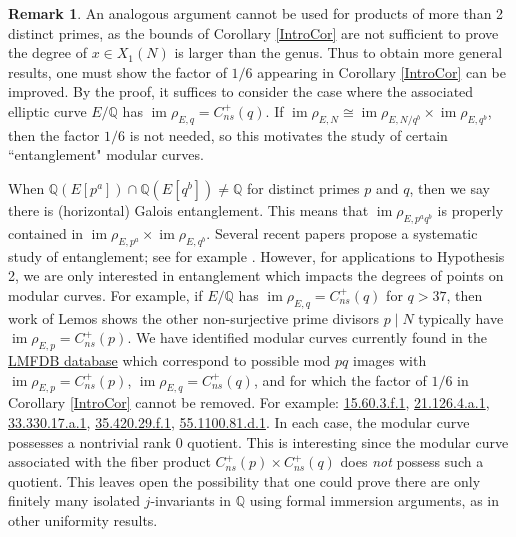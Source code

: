 \documentclass{amsart}
\theoremstyle{definition}
\newtheorem{remark}[theorem]{Remark}
\newcommand{\Q}{\mathbb{Q}}
\DeclareMathOperator{\im}{im}
\begin{document}
\begin{remark}\label{Rank0Remark} An analogous argument cannot be used for products of more than 2 distinct primes, as the bounds of Corollary \ref{IntroCor} are not sufficient to prove the degree of $x\in X_1(N)$ is larger than the genus. Thus to obtain more general results, one must show the factor of $1/6$ appearing in Corollary \ref{IntroCor} can be improved. By the proof, it suffices to consider the case where the associated elliptic curve $E/\Q$ has $\im \rho_{E,q}=C_{ns}^+(q)$. If $\im \rho_{E,N} \cong \im \rho_{E,N/q^b} \times \im \rho_{E,q^b}$, then the factor $1/6$ is not needed, so this motivates the study of certain ``entanglement" modular curves.

When $\Q(E[p^a]) \cap \Q(E[q^b])\neq \Q$ for distinct primes $p$ and $q$, then we say there is (horizontal) Galois entanglement. This means that $\im \rho_{E,p^aq^b}$ is properly contained in $\im \rho_{E,p^a} \times \im \rho_{E,q^b}$. Several recent papers propose a systematic study of entanglement; see for example \cite{DanielsMorrow22,DanielsLRMorrow23}. However, for applications to Hypothesis 2, we are only interested in entanglement which impacts the degrees of points on modular curves. For example, if $E/\Q$ has $\im \rho_{E,q}=C_{ns}^+(q)$ for $q>37$, then work of Lemos \cite{lemosTrans, lemosZ} shows the other non-surjective prime divisors $p \mid N$ typically have $\im \rho_{E,p}=C_{ns}^+(p)$. We have identified modular curves currently found in the \href{https://beta.lmfdb.org/ModularCurve/Q/}{LMFDB database} which correspond to possible mod $pq$ images with $\im \rho_{E,p}=C_{ns}^+(p)$, $\im \rho_{E,q}=C_{ns}^+(q)$, and for which the factor of $1/6$ in Corollary \ref{IntroCor} cannot be removed. For example: \href{https://beta.lmfdb.org/ModularCurve/Q/15.60.3.f.1/}{15.60.3.f.1}, \href{https://beta.lmfdb.org/ModularCurve/Q/21.126.4.a.1/}{21.126.4.a.1}, \href{https://beta.lmfdb.org/ModularCurve/Q/33.330.17.a.1/}{33.330.17.a.1}, \href{https://beta.lmfdb.org/ModularCurve/Q/35.420.29.f.1/}{35.420.29.f.1}, \href{https://beta.lmfdb.org/ModularCurve/Q/55.1100.81.d.1/}{55.1100.81.d.1}. 
In each case, the modular curve possesses a nontrivial rank 0 quotient. This is interesting since the modular curve associated with the fiber product $C_{ns}^+(p) \times C_{ns}^+(q)$ does \emph{not} possess such a quotient. This leaves open the possibility that one could prove there are only finitely many isolated $j$-invariants in $\Q$ using formal immersion arguments, as in other uniformity results.
\end{remark}
\end{document}
